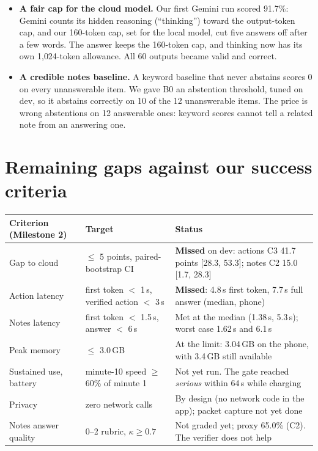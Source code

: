 \documentclass[10pt,letterpaper]{article}
\begin{document}
\begin{itemize}
  \item \textbf{A fair cap for the cloud model.} Our first Gemini run scored 91.7\%: Gemini counts its hidden reasoning (``thinking'') toward the output-token cap, and our 160-token cap, set for the local model, cut five answers off after a few words. The answer keeps the 160-token cap, and thinking now has its own 1{,}024-token allowance. All 60 outputs became valid and correct.
  \item \textbf{A credible notes baseline.} A keyword baseline that never abstains scores 0 on every unanswerable item. We gave B0 an abstention threshold, tuned on dev, so it abstains correctly on 10 of the 12 unanswerable items. The price is wrong abstentions on 12 answerable ones: keyword scores cannot tell a related note from an answering one.
\end{itemize}

\section{Remaining gaps against our success criteria}
\begin{center}
\small
\begin{tabularx}{\textwidth}{@{}l l L@{}}
\toprule
\textbf{Criterion (Milestone 2)} & \textbf{Target} & \textbf{Status} \\
\midrule
Gap to cloud & $\le$ 5 points, paired-bootstrap CI & \textbf{Missed} on dev: actions C3 41.7 points [28.3, 53.3]; notes C2 15.0 [1.7, 28.3] \\
Action latency & first token $<$ 1\,s, verified action $<$ 3\,s & \textbf{Missed}: 4.8\,s first token, 7.7\,s full answer (median, phone) \\
Notes latency & first token $<$ 1.5\,s, answer $<$ 6\,s & Met at the median (1.38\,s, 5.3\,s); worst case 1.62\,s and 6.1\,s \\
Peak memory & $\le$ 3.0\,GB & At the limit: 3.04\,GB on the phone, with 3.4\,GB still available \\
Sustained use, battery & minute-10 speed $\ge$ 60\% of minute 1 & Not yet run. The gate reached \emph{serious} within 64\,s while charging \\
Privacy & zero network calls & By design (no network code in the app); packet capture not yet done \\
Notes answer quality & 0--2 rubric, $\kappa \ge 0.7$ & Not graded yet; proxy 65.0\% (C2). The verifier does not help \\
\bottomrule
\end{tabularx}
\end{center}
\end{document}
